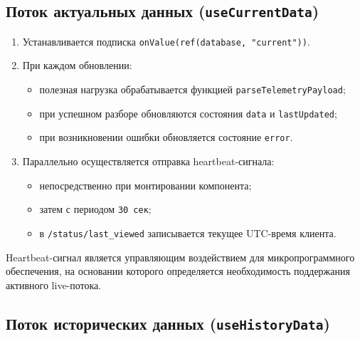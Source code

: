 \subsection{Поток актуальных данных (\texttt{useCurrentData})}

\begin{enumerate}
    \item Устанавливается подписка \texttt{onValue(ref(database, "current"))}.
    \item При каждом обновлении:
    \begin{itemize}
        \item полезная нагрузка обрабатывается функцией \texttt{parseTelemetryPayload};
        \item при успешном разборе обновляются состояния \texttt{data} и \texttt{last\allowbreak Updated};
        \item при возникновении ошибки обновляется состояние \texttt{error}.
    \end{itemize}
    \item Параллельно осуществляется отправка heartbeat-сигнала:
    \begin{itemize}
        \item непосредственно при монтировании компонента;
        \item затем с периодом \texttt{30 сек};
        \item в \texttt{/status/last\_viewed} записывается текущее UTC-время клиента.
    \end{itemize}
\end{enumerate}

Heartbeat-сигнал является управляющим воздействием для микропрограммного обеспечения, на основании которого определяется необходимость поддержания активного live-потока.

\subsection{Поток исторических данных (\texttt{useHistoryData})}

